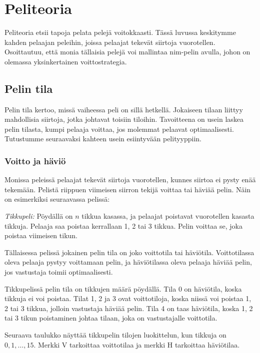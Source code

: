 \chapter{Peliteoria}

Peliteoria etsii tapoja pelata pelejä voitokkaasti.
Tässä luvussa keskitymme kahden pelaajan peleihin,
joissa pelaajat tekevät siirtoja vuorotellen.
Osoittautuu, että monia tällaisia pelejä voi mallintaa
nim-pelin avulla, johon on olemassa yksinkertainen
voittostrategia.

\section{Pelin tila}

Pelin tila kertoo, missä vaiheessa peli on
sillä hetkellä. Jokaiseen tilaan liittyy
mahdollisia siirtoja, jotka johtavat toisiin tiloihin.
Tavoitteena on usein laskea pelin tilasta,
kumpi pelaaja voittaa, jos molemmat pelaavat
optimaalisesti.
Tutustumme seuraavaksi kahteen usein esiintyvään pelityyppiin.


\subsection{Voitto ja häviö}

Monissa peleissä pelaajat tekevät siirtoja
vuorotellen, kunnes siirtoa ei pysty enää tekemään.
Pelistä riippuen viimeisen siirron tekijä
voittaa tai häviää pelin.
Näin on esimerkiksi seuraavassa pelissä:

\textit{Tikkupeli:} Pöydällä on $n$ tikkua kasassa,
ja pelaajat poistavat vuorotellen kasasta tikkuja.
Pelaaja saa poistaa kerrallaan 1, 2 tai 3 tikkua.
Pelin voittaa se, joka poistaa viimeisen tikun.

Tällaisessa pelissä jokainen pelin tila on joko
voittotila tai häviötila.
Voittotilassa oleva pelaaja pystyy
voittamaan pelin,
ja häviötilassa oleva pelaaja häviää pelin,
jos vastustaja toimii optimaalisesti.

Tikkupelissä pelin tila on tikkujen määrä pöydällä.
Tila 0 on häviötila, koska tikkuja ei voi poistaa.
Tilat 1, 2 ja 3 ovat voittotiloja,
koska niissä voi poistaa 1, 2 tai 3 tikkua,
jolloin vastustaja häviää pelin.
Tila 4 on taas häviötila, koska 1, 2 tai 3 tikun
poistaminen johtaa tilaan,
joka on vastustajalle voittotila.

Seuraava taulukko näyttää tikkupelin tilojen luokittelun,
kun tikkuja on $0,1,\ldots,15$.
Merkki V tarkoittaa voittotilaa ja merkki H tarkoittaa häviötilaa.

